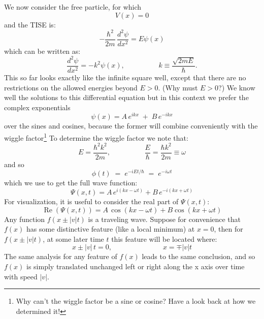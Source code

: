 \documentclass[12pt]{book}
\begin{document}
We now consider the free particle, for which
$$V(x)=0$$
and the TISE is:
\begin{equation*}
-\frac{\hbar^2}{2m}\,\frac{d^2 \psi}{d x^2} = E \psi(x)
\end{equation*}
which can be written as:
\begin{equation*}
\frac{d^2 \psi}{d x^2} = -k^2 \psi(x), \hspace{2cm} k \equiv \frac{\sqrt{2mE}}{\hbar}.
\end{equation*}
This so far looks exactly like the infinite square well, except that there are no restrictions on the allowed energies beyond $E>0$. (Why must $E>0$?)  We know well the solutions to this differential equation but in this context we prefer the complex exponentials
$$\psi(x) = A \, e^{ikx} \; + \; B \, e^{-ikx}$$
over the sines and cosines, because the former will combine conveniently with the wiggle factor\footnote{Why can't the wiggle factor be a sine or cosine?  Have a look back at how we determined it!}  To determine the wiggle factor we note that:
$$E = \frac{\hbar^2 k^2}{2m}, \hspace{2cm} \frac{E}{\hbar} = \frac{\hbar k^2}{2m} \equiv \omega$$
and so
$$\phi(t) \; = \; e^{\displaystyle -iEt/\hbar} \; = \; e^{\displaystyle -i\omega t} $$
which we use to get the full wave function:
$$\Psi(x,t) = A \, e^{\textstyle i (k x - \omega t)} + B \, e^{\textstyle -i (k x + \omega t)}$$
For visualization, it is useful to consider the real part of $\Psi(x,t)$:
$$\operatorname{Re}(\Psi(x,t)) = A \, \cos(k x - \omega t) + B \cos(k x + \omega t)$$
Any function $f(x\pm |v| t)$ is a traveling wave.  Suppose for convenience that $f(x)$ has some distinctive feature (like a local minimum) at $x=0$, then for $f(x \pm |v|t)$, at some later time $t$ this feature will be located where:
$$x \pm |v| \, t = 0, \hspace{3cm} x = \mp |v|t$$  
The same analysis for any feature of $f(x)$ leads to the same conclusion, and so $f(x)$ is simply translated unchanged left or right along the x axis over time with speed $|v|$.
\end{document}
